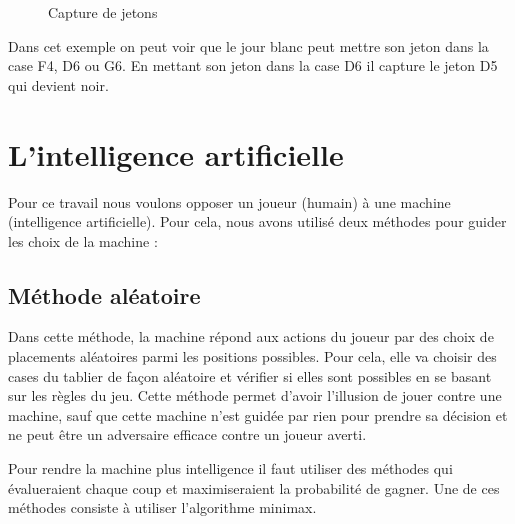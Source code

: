 \documentclass[11pt]{article}
\begin{document}
\begin{figure}[h]
  \caption {Capture de jetons}
  \noindent{}
\end{figure}

Dans cet exemple on peut voir que le jour blanc peut mettre son jeton dans la
case F4, D6 ou G6. En mettant son jeton dans la case D6 il capture le jeton D5
qui devient noir.

\section{L'intelligence artificielle}

Pour ce travail nous voulons opposer un joueur (humain) à une machine
(intelligence artificielle). Pour cela, nous avons utilisé deux
méthodes pour guider les choix de la machine :

\subsection{Méthode aléatoire}

Dans cette méthode, la machine répond aux actions du joueur par des
choix de placements aléatoires parmi les positions possibles. Pour cela,
elle va choisir des cases du tablier de fa{\c c}on aléatoire et
vérifier si elles sont possibles en se basant sur les règles du jeu.
Cette méthode permet d'avoir l'illusion de jouer contre une machine, sauf
que cette machine n'est guidée par rien pour prendre sa décision et ne
peut être un adversaire efficace contre un joueur averti.

Pour rendre la machine plus intelligence il faut utiliser des méthodes
qui évalueraient chaque coup et maximiseraient la probabilité de
gagner. Une de ces méthodes consiste à utiliser l'algorithme minimax.
\end{document}
